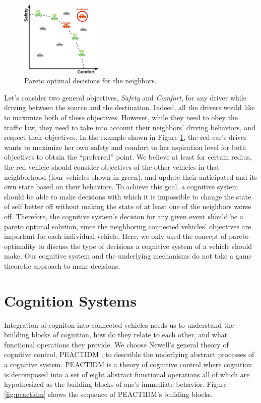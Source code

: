 \documentclass[journal, 11pt]{IEEEtran}
\begin{document}
\begin{figure}[tbh]
  \centering
  \includegraphics[width=0.35\textwidth]{figs/pareto-croped.pdf}
  \caption{{\fontsize{10}{10}\selectfont Pareto optimal decisions for the
  neighbors.}}
  \label{fig:pareto}
\end{figure}

Let's consider two general objectives, \textit{Safety} and \textit{Comfort}, for
any driver while driving between the source and the destination. Indeed, all the
drivers would like to maximize both of these objectives. However, while they
need to obey the traffic law, they need to take into account their neighbors'
driving behaviors, and respect their objectives. In the example shown in Figure
\ref{fig:pareto}, the red car's driver wants to maximize her own safety and
comfort to her aspiration level for both objectives to obtain the ``preferred''
point. We believe at least for certain redius, the red vehicle should consider
objectives of the other vehicles in that neighborhood (four vehicles shown in
green), and update their anticipated and its own state based on their behaviors.
To achieve this goal, a cognitive system should be able to make decisions with
which it is impossible to change the state of self better off without making the
state of at least one of the neighbors worse off. Therefore, the cognitive
system's decision for any given event should be a pareto optimal solution, since
the neighboring connected vehicles' objectives are important for each individual
vehicle. Here, we only used the concept of pareto optimality to discuss the type
of decisions a cognitive system of a vehicle should make. Our cognitive system
and the underlying mechanisms do not take a game theoretic approach to make
decisions.

\section{Cognition Systems}

Integration of cogniton into connected vehicles needs us to understand the
building blocks of cognition, how do they relate to each other, and what
functional operations they provide. We choose Newell's general theory of
cognitive control, PEACTIDM \cite{newell:unified-cognition}, to describle the
underlying abstract processes of a cognitive system. PEACTIDM is a theory of
cognitive control where cognition is decomposed into a set of eight abstract
functional operations \cite{newell:unified-cognition} all of which are
hypothesized as the building blocks of one's immediate behavior. Figure
\ref{fig:peactidm} shows the sequence of PEACTIDM's building blocks.
\end{document}
